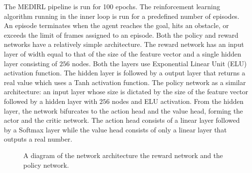 The MEDIRL pipeline is run for 100 epochs. The reinforcement learning algorithm \cite{a2c} running in the inner loop is run for a predefined number of episodes. An episode terminates when the agent reaches the goal, hits an obstacle, or exceeds the limit of frames assigned to an episode. Both the policy and reward networks have a relatively simple architecture. The reward network has an input layer of width equal to that of the size of the feature vector and a single hidden layer consisting of $256$ nodes. Both the layers use Exponential Linear Unit (ELU) \cite{elu} activation function. The hidden layer is followed by a output layer that returns a real value which uses a Tanh activation function. The policy network as a similar architecture: an input layer whose size is dictated by the size of the feature vector followed by a hidden layer with $256$ nodes and ELU activation. From the hidden layer, the network bifurcates to the action head and the value head, forming the actor and the critic network. The action head consists of a linear layer followed by a Softmax layer while the value head consists of only a linear layer that outputs a real number.

\begin{figure}
	\caption {A diagram of the network architecture the reward network and the policy network.}
\end{figure}

